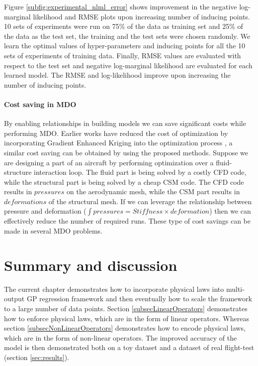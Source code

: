 Figure \ref{subfig:experimental_nlml_error} shows improvement in the negative log-marginal likelihood and RMSE plots upon increasing number of inducing points. 10 sets of experiments were run on 75\% of the data as training set and 25\% of the data as the test set, the training and the test sets were chosen randomly. We learn the optimal values of hyper-parameters and inducing points for all the 10 sets of experiments of training data. Finally, RMSE values are evaluated with respect to the test set and negative log-marginal likelihood are evaluated for each learned model. The RMSE and log-likelihood improve upon increasing the number of inducing points. 

\paragraph{Cost saving in MDO}
By enabling relationships in building models we can save significant costs while performing MDO. Earlier works have reduced the cost of optimization by incorporating Gradient Enhanced Kriging into the optimization process \cite{liem2015surrogate}, a similar cost saving can be obtained by using the proposed methods. Suppose we are designing a part of an aircraft by performing optimization over a fluid-structure interaction loop. The fluid part is being solved by a costly CFD code, while the structural part is being solved by a cheap CSM code. The CFD code results in $pressures$ on the aerodynamic mesh, while the CSM part results in $deformations$ of the structural mesh. If we can leverage the relationship between pressure and deformation ($\int pressures = Stiffness \times deformation$) then we can effectively reduce the number of required runs. These type of cost savings can be made in several MDO problems. 


\section{Summary and discussion}
The current chapter demonstrates how to incorporate physical laws into multi-output GP regression framework and then eventually how to scale the framework to a large number of data points. Section \ref{subsecLinearOperators} demonstrates how to enforce physical laws, which are in the form of linear operators. Whereas section \ref{subsecNonLinearOperators} demonstrates how to encode physical laws, which are in the form of non-linear operators. The improved accuracy of the model is then demonstrated both on a toy dataset and a dataset of real flight-test (section \ref{sec:results}). 

